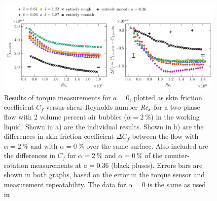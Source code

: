\documentclass[aps,twocolumn,10pt,floatfix, superscriptaddress,longbibliography,pra]{revtex4-1}
\newcommand\Rey{\mbox{\textit{Re$_s$}}}  %
\newcommand{\perc}[1]{ \SI{#1}{\percent} }
\begin{document}
\begin{figure}
  \includegraphics[scale=1]{./figures/fig6_DR_rough_smooth_alpha=2}
  \caption{Results of torque measurements for $a=0$, plotted as skin friction coefficient $C_f$ versus shear Reynolds number $\Rey$ for a two-phase flow with 2 volume percent air bubbles ($\alpha = \perc{2}$) in the working liquid. Shown in a) are the individual results. Shown in b) are the differences in skin friction coefficient $\Delta C_f$ between the flow with $\alpha = \perc{2}$ and with $\alpha = \perc{0}$ over the same surface. Also included are the differences in $C_f$ for $\alpha = \perc{2}$ and $\alpha = \perc{0}$ of the counter-rotation measurements at $a = 0.36$ (black pluses). Errors bars are shown in both graphs, based on the error in the torque sensor and measurement repeatability. The data for $\alpha = 0$ is the same as used in~\citep{Bakhuis2019}.}\label{fig:two-phase}
\end{figure}
\end{document}
